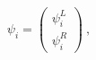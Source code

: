 \begin{equation}
\psi_i = \left(\begin{array}{c}\psi_i^L\\ \psi_i^R
\end{array}\right)~,
\label{4dlr}
\end{equation}

